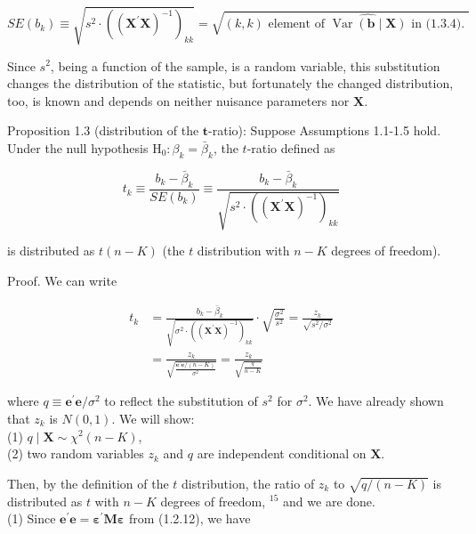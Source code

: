 \documentclass[10pt]{article}
\begin{document}
\begin{equation*}
S E\left(b_{k}\right) \equiv \sqrt{s^{2} \cdot\left(\left(\mathbf{X}^{\prime} \mathbf{X}\right)^{-1}\right)_{k k}}=\sqrt{(k, k) \text { element of } \widehat{\operatorname{Var}(\mathbf{b} \mid \mathbf{X})} \text { in (1.3.4). }} \tag{1.4.4}
\end{equation*}


Since $s^{2}$, being a function of the sample, is a random variable, this substitution changes the distribution of the statistic, but fortunately the changed distribution, too, is known and depends on neither nuisance parameters nor $\mathbf{X}$.

Proposition 1.3 (distribution of the $\boldsymbol{t}$-ratio): Suppose Assumptions 1.1-1.5 hold. Under the null hypothesis $\mathrm{H}_{0}: \beta_{k}=\bar{\beta}_{k}$, the $t$-ratio defined as


\begin{equation*}
t_{k} \equiv \frac{b_{k}-\bar{\beta}_{k}}{S E\left(b_{k}\right)} \equiv \frac{b_{k}-\bar{\beta}_{k}}{\sqrt{s^{2} \cdot\left(\left(\mathbf{X}^{\prime} \mathbf{X}\right)^{-1}\right)_{k k}}} \tag{1.4.5}
\end{equation*}


is distributed as $t(n-K)$ (the $t$ distribution with $n-K$ degrees of freedom).

Proof. We can write

$$
\begin{aligned}
t_{k} & =\frac{b_{k}-\bar{\beta}_{k}}{\sqrt{\sigma^{2} \cdot\left(\left(\mathbf{X}^{\prime} \mathbf{X}\right)^{-1}\right)_{k k}}} \cdot \sqrt{\frac{\sigma^{2}}{s^{2}}}=\frac{z_{k}}{\sqrt{s^{2} / \sigma^{2}}} \\
& =\frac{z_{k}}{\sqrt{\frac{\mathbf{e}^{\prime} \mathbf{e} /(n-K)}{\sigma^{2}}}}=\frac{z_{k}}{\sqrt{\frac{q}{n-K}}}
\end{aligned}
$$

where $q \equiv \mathbf{e}^{\prime} \mathbf{e} / \sigma^{2}$ to reflect the substitution of $s^{2}$ for $\sigma^{2}$. We have already shown that $z_{k}$ is $N(0,1)$. We will show:\\
(1) $q \mid \mathbf{X} \sim \chi^{2}(n-K)$,\\
(2) two random variables $z_{k}$ and $q$ are independent conditional on $\mathbf{X}$.

Then, by the definition of the $t$ distribution, the ratio of $z_{k}$ to $\sqrt{q /(n-K)}$ is distributed as $t$ with $n-K$ degrees of freedom, ${ }^{15}$ and we are done.\\
(1) Since $\mathbf{e}^{\prime} \mathbf{e}=\boldsymbol{\varepsilon}^{\prime} \mathbf{M} \boldsymbol{\varepsilon}$ from (1.2.12), we have
\end{document}
